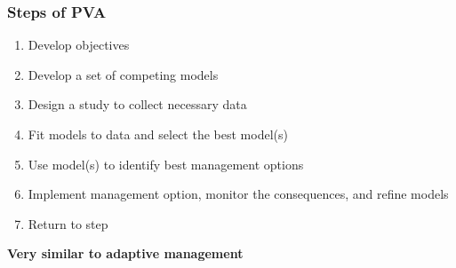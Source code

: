 \documentclass[color=usenames,dvipsnames]{beamer}\usepackage[]{graphicx}\usepackage[]{color}
\begin{document}
\begin{frame}
  \frametitle{Steps of PVA}
  \large
  \begin{enumerate}[(1)]%
    \item Develop objectives
    \item Develop a set of competing models
    \item Design a study to collect necessary data
    \item Fit models to data and select the best model(s)
    \item Use model(s) to identify best management options
    \item Implement management option, monitor the consequences, and refine models
    \item Return to step \color{beamer@blendedblue}{(4)}%
  \end{enumerate}
  \vfill
  \centering
  \pause
  {\bf Very similar to adaptive management \\}
\end{frame}
\end{document}

